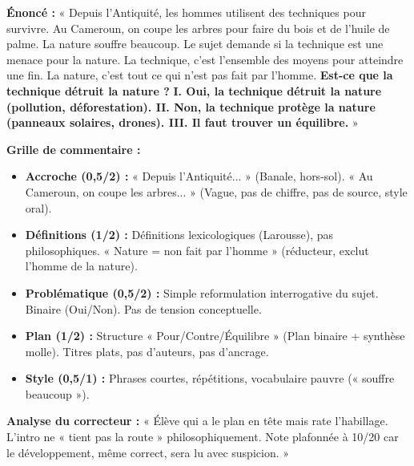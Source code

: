 \documentclass[11pt]{article}
\begin{document}
\begin{exoresolu}
\textbf{Énoncé :}
« Depuis l'Antiquité, les hommes utilisent des techniques pour survivre. Au Cameroun, on coupe les arbres pour faire du bois et de l'huile de palme. La nature souffre beaucoup. Le sujet demande si la technique est une menace pour la nature. La technique, c'est l'ensemble des moyens pour atteindre une fin. La nature, c'est tout ce qui n'est pas fait par l'homme. \textbf{Est-ce que la technique détruit la nature ?} \textbf{I. Oui, la technique détruit la nature (pollution, déforestation). II. Non, la technique protège la nature (panneaux solaires, drones). III. Il faut trouver un équilibre.} »

\textbf{Grille de commentaire :}
\begin{itemize}
    \item \textbf{Accroche (0,5/2) :} « Depuis l'Antiquité... » (Banale, hors-sol). « Au Cameroun, on coupe les arbres... » (Vague, pas de chiffre, pas de source, style oral).
    \item \textbf{Définitions (1/2) :} Définitions lexicologiques (Larousse), pas philosophiques. « Nature = non fait par l'homme » (réducteur, exclut l'homme de la nature).
    \item \textbf{Problématique (0,5/2) :} Simple reformulation interrogative du sujet. Binaire (Oui/Non). Pas de tension conceptuelle.
    \item \textbf{Plan (1/2) :} Structure « Pour/Contre/Équilibre » (Plan binaire + synthèse molle). Titres plats, pas d'auteurs, pas d'ancrage.
    \item \textbf{Style (0,5/1) :} Phrases courtes, répétitions, vocabulaire pauvre (« souffre beaucoup »).
\end{itemize}
\tcblower
\textbf{Analyse du correcteur :} « Élève qui a le plan en tête mais rate l'habillage. L'intro ne « tient pas la route » philosophiquement. Note plafonnée à 10/20 car le développement, même correct, sera lu avec suspicion. »
\end{exoresolu}
\end{document}
